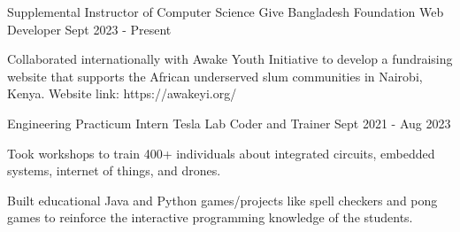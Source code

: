 

\begin{cventries}

\cventryalt
    {Supplemental Instructor of Computer Science} %
    {Give Bangladesh Foundation} %
    {Web Developer} %
    {Sept 2023 - Present} %
    {
      \begin{cvitems}
      \item {Collaborated internationally with Awake Youth Initiative to develop a fundraising website that supports the African underserved slum communities in Nairobi, Kenya. Website link: https://awakeyi.org/}
      \end{cvitems}
    }

\cventryalt
    {Engineering Practicum Intern} %
    {Tesla Lab} %
    {Coder and Trainer} %
    {Sept 2021 - Aug 2023} %
    {
      \begin{cvitems}
        \item {Took workshops to train 400+ individuals about integrated circuits, embedded systems, internet of things, and drones.}
        \item {Built educational Java and Python games/projects like spell checkers and pong games to reinforce the interactive programming knowledge of the students.}
      \end{cvitems}
    }

\end{cventries}
